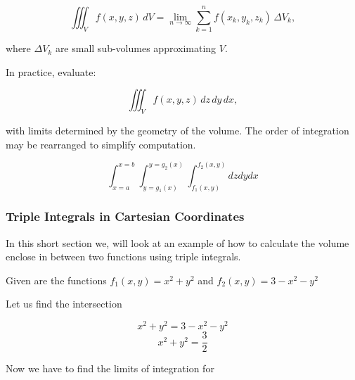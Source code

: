 \[
    \iiint_V f(x, y, z)\, dV = \lim_{n \to \infty} \sum_{k=1}^n f(x_k, y_k, z_k) \, \Delta V_k,
\]

where \( \Delta V_k \) are small sub-volumes approximating \( V \).

In practice, evaluate:

\[
    \iiint_V f(x, y, z)\, dz\, dy\, dx,
\]

with limits determined by the geometry of the volume. The order of integration may be rearranged to 
simplify computation.

\[
    \int_{x=a}^{x=b}\int_{y=g_1(x)}^{y=g_2(x)} \int_{f_1(x,y)}^{f_2(x,y)} dz dy dx
\]

\subsubsection{Triple Integrals in Cartesian Coordinates}

In this short section we, will look at an example of how to calculate the volume enclose in
between two functions using triple integrals.

Given are the functions \(f_1(x,y) = x^2 + y^2\) and \(f_2(x,y) = 3 - x^2 - y^2\)

\begin{center}
    
\end{center}

Let us find the intersection

\[
    x^2 + y^2 = 3 -x^2 - y^2 
\]
\[
    x^2 + y^2 = \frac{3}{2}
\]

Now we have to find the limits of integration for 

